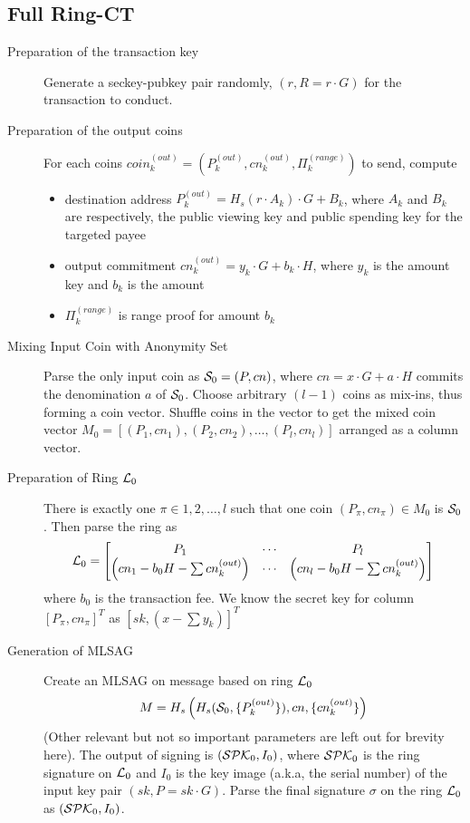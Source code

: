 \subsection{Full Ring-CT}
	\begin{description}
		\item[Preparation of the transaction key] Generate a seckey-pubkey pair randomly, \( (r,R=r\cdot G)\) for the transaction to conduct.
		\item[Preparation of the output coins] For each coins \(coin_k^{(out)}=(P_k^{(out)},cn_k^{(out)}, \Pi_k^{(range)})\) to send, compute 
			\begin{itemize}
				\item destination address \(P_k^{(out)}=H_s(r\cdot A_k)\cdot G+B_k\), where \(A_k\) and \(B_k\) are respectively, the public viewing key and public spending key for the targeted payee
				\item output commitment \(cn_k^{(out)}=y_k\cdot G+b_k\cdot H\), where \(y_k\) is the amount key and \(b_k\) is the amount
				\item \(\Pi_k^{(range)}\) is range proof for amount \(b_k\)
			\end{itemize}
		\item[Mixing Input Coin with Anonymity Set] Parse the only input coin as \(\mathcal{S}_0=(P,cn)\), where \(cn=x\cdot G+a\cdot H\) commits the denomination \(a\) of \(\mathcal{S}_0\). Choose arbitrary \( (l-1)\) coins as mix-ins, thus forming a coin vector. Shuffle coins in the vector to get the mixed coin vector \(M_0=[(P_1,cn_1),(P_2,cn_2),\dots,(P_l,cn_l)]\) arranged as a column vector. 
		\item[Preparation of Ring \(\mathcal{L}_0\)] There is exactly one \(\pi\in{1,2,\dots,l}\) such that one coin \((P_{\pi},cn_{\pi})\in M_0\) is \(\mathcal{S}_0\). Then parse the ring as
		\[
			\mathcal{L}_0=
			\begin{bmatrix}
				P_1 &\cdots &P_l \\
				\left(cn_1-b_0H-\sum cn_k^{(out)}\right) &\cdots &\left(cn_l-b_0H-\sum cn_k^{(out)}\right)			
			\end{bmatrix}
		\]
		where \(b_0\) is the transaction fee. We know the secret key for column \([P_{\pi}, cn_{\pi}]^T\) as \([sk,(x-\sum y_k)]^T\)
		\item[Generation of MLSAG] Create an MLSAG on message based on ring \(\mathcal{L}_0\)
		\[
			M=H_s\left(H_s(\mathcal{S}_0, \{P_k^{(out)}\}),cn,\{cn_k^{(out)}\}\right)
		\] 
		(Other relevant but not so important parameters are left out for brevity here). The output of signing is \( (\mathcal{SPK}_0, I_0)\), where \(\mathcal{SPK}_0\) is the ring signature on \(\mathcal{L}_0\) and \(I_0\) is the key image (a.k.a, the serial number) of the input key pair \( (sk,P=sk\cdot G)\). Parse the final signature \(\sigma\) on the ring \(\mathcal{L}_0\) as \( (\mathcal{SPK}_0,I_0)\).\par

\end{description}
